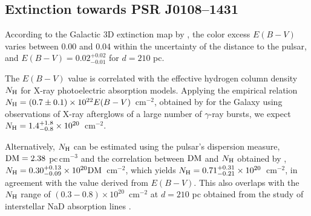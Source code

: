 \documentclass[pdftex,twocolumn]{aastex62}
\newcommand{\gp}[1]{{\color{blue} #1}}
\begin{document}
\subsection{Extinction towards PSR J0108--1431}
According to the Galactic 3D extinction map by \citet{Green2018},
the color excess $E(B-V)$ varies between 0.00 and 0.04 within the uncertainty of the distance to the pulsar, %
and $E(B-V)=0.02^{+0.02}_{-0.01}$ 
for  $d=210$ pc.  

The $E(B-V)$ value is correlated  %
with the %
effective hydrogen column density $N_{\rm H}$
for X-ray photoelectric absorption models. 
Applying the empirical relation $N_{\rm H}=(0.7\pm0.1) \times 10^{22} E(B-V)$~cm$^{-2}$, obtained by \citet{Watson2011} for the Galaxy using observations of X-ray afterglows of a large number of $\gamma$-ray bursts, we 
expect $N_{\rm H}=1.4^{+1.8}_{-0.8}\times 10^{20}$~cm$^{-2}$.



Alternatively, $N_{\rm H}$
can be estimated 
using the pulsar's dispersion measure, ${\rm DM} = 2.38$ pc\,cm$^{-3}$ and the correlation between  ${\rm DM}$ and $N_{\rm H}$ obtained by \citet{He2013}, 
 $N_{\rm H}= 0.30^{+0.13}_{-0.09} \times 10^{20} {\rm DM}$~cm$^{-2}$, which yields 
$N_{\rm H}=0.71^{+0.31}_{-0.21}\times 10^{20}$~cm$^{-2}$, in 
agreement with the value derived from $E(B-V)$. 
This also overlaps with the $N_{\rm H}$ range of $(0.3-0.8)\times 10^{20}$~cm$^{-2}$ at $d=210$ pc obtained from 
the study of interstellar NaD absorption lines \citep{posselt2007,posselt2008}. 
\end{document}
